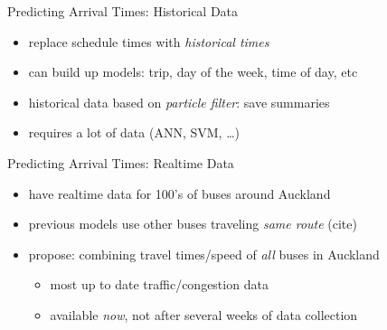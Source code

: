\documentclass[10pt,t]{beamer}
\begin{document}
\begin{frame}{Predicting Arrival Times: Historical Data}
  \onslide<+->

  \begin{itemize}[<+- | alert@+>]
  \item replace schedule times with \emph{historical times}
  \item can build up models: trip, day of the week, time of day, etc
  \item historical data based on \emph{particle filter}: save summaries
  \item requires a lot of data (ANN, SVM, \ldots)
  \end{itemize}

  \onslide<+->
\end{frame}


\begin{frame}{Predicting Arrival Times: Realtime Data}
  \onslide<+->
  
  \begin{itemize}[<+- | alert@+>]
  \item have realtime data for 100's of buses around Auckland
  \item previous models use other buses traveling \emph{same route}
    (cite)
  \item propose: combining travel times/speed of \emph{all} buses in Auckland
    \begin{itemize}
    \item most up to date traffic/congestion data
    \item available \emph{now}, not after several weeks of data collection
    \end{itemize}
  \end{itemize}

  \onslide<+->
\end{frame}
\end{document}
